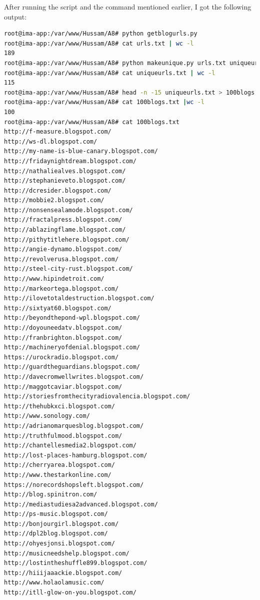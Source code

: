 \documentclass[a4paper, 11pt]{article}
\begin{document}


After running the script and the command mentioned earlier, I got the following output:

\begin{lstlisting}[language=bash, breakatwhitespace=〈false), label=Running getblogurls.py, caption=Running getblogurls.py]
root@ima-app:/var/www/Hussam/A8# python getblogurls.py
root@ima-app:/var/www/Hussam/A8# cat urls.txt | wc -l
189
root@ima-app:/var/www/Hussam/A8# python makeunique.py urls.txt uniqueurls.txt
root@ima-app:/var/www/Hussam/A8# cat uniqueurls.txt | wc -l
115
root@ima-app:/var/www/Hussam/A8# head -n -15 uniqueurls.txt > 100blogs.txt
root@ima-app:/var/www/Hussam/A8# cat 100blogs.txt |wc -l
100
root@ima-app:/var/www/Hussam/A8# cat 100blogs.txt
http://f-measure.blogspot.com/
http://ws-dl.blogspot.com/
http://my-name-is-blue-canary.blogspot.com/
http://fridaynightdream.blogspot.com/
http://nathaliealves.blogspot.com/
http://stephanieveto.blogspot.com/
http://dcresider.blogspot.com/
http://mobbie2.blogspot.com/
http://nonsensealamode.blogspot.com/
http://fractalpress.blogspot.com/
http://ablazingflame.blogspot.com/
http://pithytitlehere.blogspot.com/
http://angie-dynamo.blogspot.com/
http://revolverusa.blogspot.com/
http://steel-city-rust.blogspot.com/
http://www.hipindetroit.com/
http://markeortega.blogspot.com/
http://ilovetotaldestruction.blogspot.com/
http://sixtyat60.blogspot.com/
http://beyondthepond-wpl.blogspot.com/
http://doyouneedatv.blogspot.com/
http://franbrighton.blogspot.com/
http://machineryofdenial.blogspot.com/
https://urockradio.blogspot.com/
http://guardtheguardians.blogspot.com/
http://davecromwellwrites.blogspot.com/
http://maggotcaviar.blogspot.com/
http://storiesfromthecityradiovalencia.blogspot.com/
http://thehubkxci.blogspot.com/
http://www.sonology.com/
http://adrianomarquesblog.blogspot.com/
http://truthfulmood.blogspot.com/
http://chantellesmedia2.blogspot.com/
http://lost-places-hamburg.blogspot.com/
http://cherryarea.blogspot.com/
http://www.thestarkonline.com/
https://norecordshopsleft.blogspot.com/
http://blog.spinitron.com/
http://mediastudiesa2advanced.blogspot.com/
http://ps-music.blogspot.com/
http://bonjourgirl.blogspot.com/
http://dpl2blog.blogspot.com/
http://ohyesjonsi.blogspot.com/
http://musicneedshelp.blogspot.com/
http://lostintheshuffle899.blogspot.com/
http://hiiijaaackie.blogspot.com/
http://www.holaolamusic.com/
http://itll-glow-on-you.blogspot.com/

\end{lstlisting}
\end{document}
